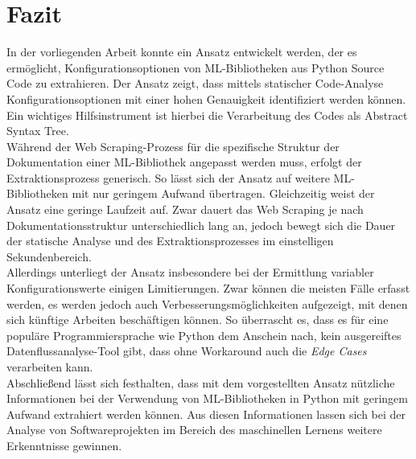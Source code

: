 \documentclass[german,bachelor]{swsLeipzig}
\begin{document}

\chapter{Fazit}\label{Fazit}
In der vorliegenden Arbeit konnte ein Ansatz entwickelt werden, der es ermöglicht, Konfigurationsoptionen von ML-Bibliotheken
aus Python Source Code zu extrahieren.
Der Ansatz zeigt, dass mittels statischer Code-Analyse Konfigurationsoptionen mit einer hohen Genauigkeit identifiziert werden
können.
Ein wichtiges Hilfsinstrument ist hierbei die Verarbeitung des Codes als Abstract Syntax Tree. \\

Während der Web Scraping-Prozess für die spezifische Struktur der Dokumentation einer ML-Bibliothek angepasst werden muss,
erfolgt der Extraktionsprozess generisch.
So lässt sich der Ansatz auf weitere ML-Bibliotheken mit nur geringem Aufwand übertragen.
Gleichzeitig weist der Ansatz eine geringe Laufzeit auf.
Zwar dauert das Web Scraping je nach Dokumentationsstruktur unterschiedlich lang an, jedoch bewegt sich die Dauer der statische Analyse
und des Extraktionsprozesses im einstelligen Sekundenbereich.\\

Allerdings unterliegt der Ansatz insbesondere bei der Ermittlung variabler Konfigurationswerte einigen Limitierungen.
Zwar können die meisten Fälle erfasst werden, es werden jedoch auch Verbesserungsmöglichkeiten aufgezeigt,
mit denen sich künftige Arbeiten beschäftigen können.
So überrascht es, dass es für eine populäre Programmiersprache wie Python dem Anschein nach, kein ausgereiftes
Datenflussanalyse-Tool gibt, dass ohne Workaround auch die \textit{Edge Cases} verarbeiten kann. \\

Abschließend lässt sich festhalten, dass mit dem vorgestellten Ansatz nützliche Informationen bei der Verwendung
von ML-Bibliotheken in Python mit geringem Aufwand extrahiert werden können.
Aus diesen Informationen lassen sich bei der Analyse von Softwareprojekten im Bereich des maschinellen Lernens weitere
Erkenntnisse gewinnen.


\end{document}
